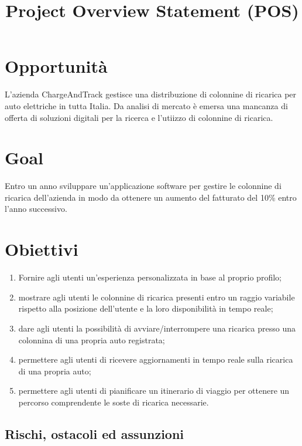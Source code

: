 \documentclass[a4paper,12pt]{article}
\title{\textbf{Project Overview Statement (POS)}}
\author{}
\date{}
\begin{document}
\maketitle
\tableofcontents

\newpage

\section{Opportunità}
L'azienda ChargeAndTrack gestisce una distribuzione di colonnine di ricarica per auto elettriche in tutta Italia.
Da analisi di mercato è emersa una mancanza di offerta di soluzioni digitali per la ricerca e l'utiizzo di colonnine
di ricarica.

\section{Goal}
Entro un anno sviluppare un'applicazione software per gestire le colonnine di ricarica dell'azienda in modo da ottenere
un aumento del fatturato del 10\% entro l'anno successivo.

\section{Obiettivi}
\begin{enumerate}
    \item Fornire agli utenti un'esperienza personalizzata in base al proprio profilo;
    \item mostrare agli utenti le colonnine di ricarica presenti entro un raggio variabile rispetto alla posizione
    dell'utente e la loro disponibilità in tempo reale;
    \item dare agli utenti la possibilità di avviare/interrompere una ricarica presso una colonnina di una propria auto
    registrata;
    \item permettere agli utenti di ricevere aggiornamenti in tempo reale sulla ricarica di una propria auto;
    \item permettere agli utenti di pianificare un itinerario di viaggio per ottenere un percorso comprendente le soste
    di ricarica necessarie.
\end{enumerate}

\subsection{Rischi, ostacoli ed assunzioni}
\end{document}
